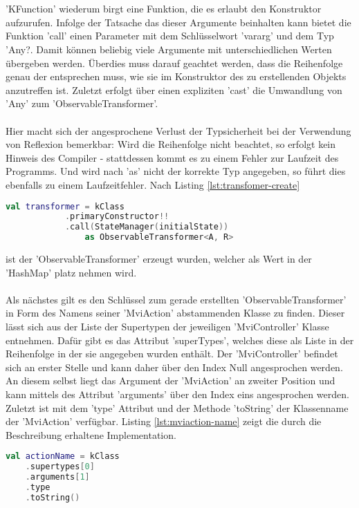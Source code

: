 \\\\
'KFunction' wiederum birgt eine Funktion, die es erlaubt den Konstruktor aufzurufen. Infolge der Tatsache das dieser Argumente beinhalten kann bietet die Funktion 'call' einen Parameter mit dem Schlüsselwort 'vararg' und dem Typ 'Any?. Damit können beliebig viele Argumente mit unterschiedlichen Werten übergeben werden. Überdies muss darauf geachtet werden, dass die Reihenfolge genau der entsprechen muss, wie sie im Konstruktor des zu erstellenden Objekts anzutreffen ist. Zuletzt erfolgt über einen expliziten 'cast' die Umwandlung von 'Any' zum 'ObservableTransformer'. 
\\\\
Hier macht sich der angesprochene Verlust der Typsicherheit bei der Verwendung von Reflexion bemerkbar: Wird die Reihenfolge nicht beachtet, so erfolgt kein Hinweis des Compiler - stattdessen kommt es zu einem Fehler zur Laufzeit des Programms. Und wird nach 'as' nicht der korrekte Typ angegeben, so führt dies ebenfalls zu einem Laufzeitfehler. Nach Listing
\ref{lst:transfomer-create}
\begin{lstlisting}[caption={Konsruktor}, label={lst:transfomer-create},language=Kotlin]
val transformer = kClass
			.primaryConstructor!!
			.call(StateManager(initialState)) 
				as ObservableTransformer<A, R>
\end{lstlisting}
ist der 'ObservableTransformer' erzeugt wurden, welcher als Wert in der 'HashMap' platz nehmen wird.
\\\\
Als nächstes gilt es den Schlüssel zum gerade erstellten 'ObservableTransformer' in Form des Namens seiner 'MviAction' abstammenden Klasse zu finden. Dieser lässt sich aus der Liste der Supertypen der jeweiligen  'MviController' Klasse entnehmen. Dafür gibt es das Attribut 'superTypes', welches diese als Liste in der Reihenfolge in der sie angegeben wurden enthält. Der 'MviController' befindet sich an erster Stelle und kann daher über den Index Null angesprochen werden. An diesem selbst liegt das Argument der 'MviAction' an zweiter Position und kann mittels des Attribut 'arguments' über den Index eins angesprochen werden. Zuletzt ist mit dem 'type' Attribut und der Methode 'toString' der Klassenname der 'MviAction' verfügbar. Listing
\ref{lst:mviaction-name}
zeigt die durch die Beschreibung erhaltene Implementation. 
\begin{lstlisting}[caption={'MviAction' Name }, label={lst:mviaction-name},language=Kotlin]
val actionName = kClass
	.supertypes[0]
	.arguments[1]
	.type
	.toString()
\end{lstlisting}
